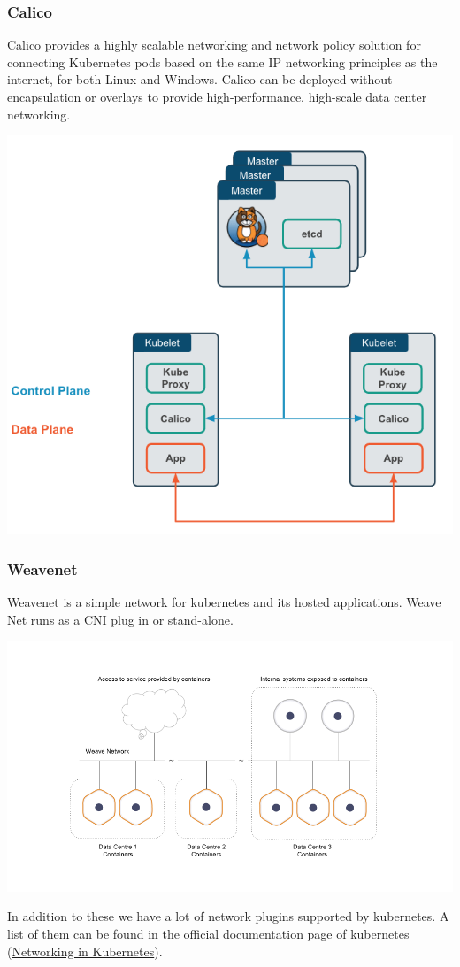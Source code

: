 \documentclass[12pt]{article}
\begin{document}
\subsubsection{Calico}
Calico provides a highly scalable networking and network policy solution for connecting Kubernetes pods based on the same IP networking principles as the internet, for both Linux and Windows. Calico can be deployed without encapsulation or overlays to provide high-performance, high-scale data center networking.
\begin{center}
	\includegraphics[totalheight=0.4\textheight]{calico}
\end{center}
\subsubsection{Weavenet}
Weavenet is a simple network for kubernetes and its hosted applications. Weave Net runs as a CNI plug in or stand-alone.
\begin{center}
	\includegraphics[totalheight=0.35\textheight]{weavenet}
\end{center}
In addition to these we have a lot of network plugins supported by kubernetes. A list of them can be found in the official documentation page of kubernetes (\href{https://kubernetes.io/docs/concepts/cluster-administration/networking/}{Networking in Kubernetes}).
\end{document}

